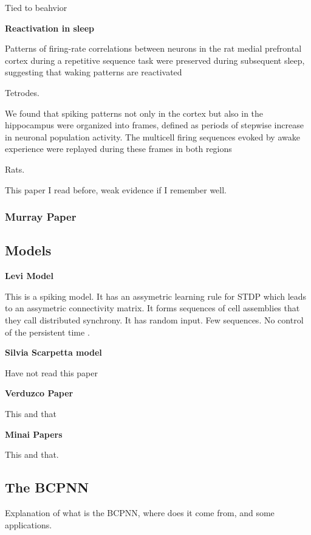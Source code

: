 \documentclass[10pt,a4paper]{article}
\begin{document}
Tied to beahvior

\cite{harvey2012choice}

\textbf{Reactivation in sleep}

Patterns of firing-rate correlations between neurons in the rat medial prefrontal cortex during a repetitive sequence task were preserved during subsequent sleep, suggesting that waking patterns are reactivated

Tetrodes. 
\cite{euston2007fast}

We found that spiking patterns not only in the cortex but also in the hippocampus were organized into frames, defined as periods of stepwise increase in neuronal population activity. The multicell firing sequences evoked by awake experience were replayed during these frames in both regions

Rats. 
\cite{ji2007coordinated}

This paper I read before, weak evidence if I remember well. 
\cite{almeida2014investigation}
\subsubsection*{Murray Paper}

\subsection{Models}

\textbf{Levi Model}

This is a spiking model. It has an assymetric learning rule for STDP which leads to an assymetric connectivity matrix. It forms sequences of cell assemblies that they call distributed synchrony. It has random input. Few sequences.
No control of the persistent time \cite{levy2001distributed}.


\textbf{Silvia Scarpetta model}

Have not read this paper
\cite{scarpetta2013associative}



\textbf{Verduzco Paper}

This and that
\cite{verduzco2012model}

\textbf{Minai Papers}

This and that. 

\subsection{The BCPNN}
Explanation of what is the BCPNN, where does it come from, and some applications. 
\end{document}
